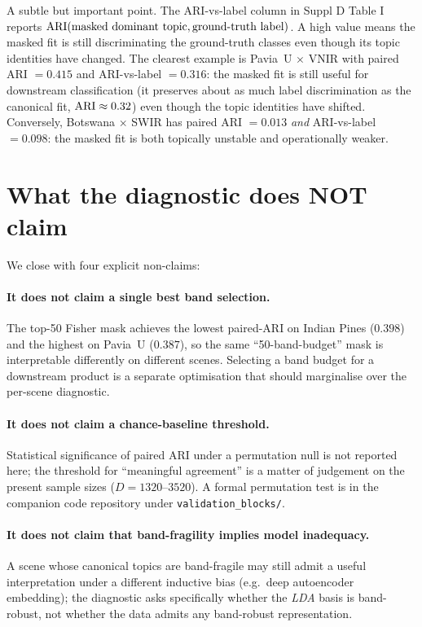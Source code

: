 \documentclass[11pt,a4paper]{article}
\begin{document}
A subtle but important point. The ARI-vs-label column in
Suppl D Table I reports
$\mathrm{ARI}(\text{masked dominant topic}, \text{ground-truth label})$. A
high value means the masked fit is still discriminating the
ground-truth classes even though its topic identities have changed.
The clearest example is Pavia~U $\times$ VNIR with paired ARI
$=0.415$ and ARI-vs-label $=0.316$: the masked fit is still useful
for downstream classification (it preserves about as much label
discrimination as the canonical fit, $\mathrm{ARI} \approx 0.32$) even
though the topic identities have shifted. Conversely, Botswana
$\times$ SWIR has paired ARI $=0.013$ \emph{and} ARI-vs-label
$=0.098$: the masked fit is both topically unstable and operationally
weaker.

\section{What the diagnostic does NOT claim}

We close with four explicit non-claims:

\paragraph{It does not claim a single best band selection.} The
top-50 Fisher mask achieves the lowest paired-ARI on Indian Pines
($0.398$) and the highest on Pavia~U ($0.387$), so the same
``50-band-budget'' mask is interpretable differently on different
scenes. Selecting a band budget for a downstream product is a
separate optimisation that should marginalise over the per-scene
diagnostic.

\paragraph{It does not claim a chance-baseline threshold.}
Statistical significance of paired ARI under a permutation null is
not reported here; the threshold for ``meaningful agreement'' is a
matter of judgement on the present sample sizes ($D = 1320$--$3520$).
A formal permutation test is in the companion code repository under
\texttt{validation\_blocks/}.

\paragraph{It does not claim that band-fragility implies model
inadequacy.} A scene whose canonical topics are band-fragile may
still admit a useful interpretation under a different inductive bias
(e.g.\ deep autoencoder embedding); the diagnostic asks specifically
whether the \emph{LDA} basis is band-robust, not whether the data
admits any band-robust representation.
\end{document}
